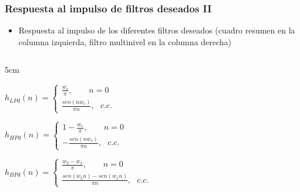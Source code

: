 \begin{frame}
\frametitle{Respuesta al impulso de filtros deseados II}
\footnotesize

\begin{itemize}
\item Respuesta al impulso de los diferentes filtros deseados (cuadro resumen en la columna izquierda, filtro multinivel en la columna derecha)
\end{itemize}

\begin{columns}[T]
\begin{column}{5cm}

\scriptsize



\vspace{0.1cm}
$h_{LPd}(n)=\!\left \{\!\!\!\begin{array}{l}\frac{w_c}{\pi}, \:\:\:  \:\:\: \:\:\: n=0\\ \frac{sen(nw_c)}{\pi n},  \:\:\: c.c.\end{array}  \right . $

\vspace{0.1cm}




\vspace{0.1cm}

$h_{HPd}(n)=\!\left \{\!\!\!\begin{array}{l}1-\frac{w_c}{\pi}, \:\:\:  \:\:\: \:\:\: n=0\\ -\frac{sen(nw_c)}{\pi n},  \:\:\: c.c.\end{array}  \right . $

\vspace{0.1cm}


\vspace{0.1cm}


$h_{BPd}(n)=\!\left \{\!\!\!\begin{array}{l}\frac{w_2-w_1}{\pi}, \:\:\:  \:\:\: \:\:\: n=0\\ \frac{sen(w_2n)-sen(w_1n)}{\pi n},  \:\:\: c.c.\end{array}  \right . $


\vspace{0.1cm}



\vspace{0.1cm}


\end{column}
\end{columns}
\end{frame}
